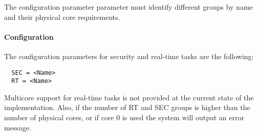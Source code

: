 The configuration parameter parameter must identify different groups by name
and their physical core requirements.




\paragraph{Configuration}
The configuration parameters for security and real-time tasks are the
following:
\begin{lstlisting}
  SEC = <Name>
  RT = <Name>
\end{lstlisting}
Multicore support for real-time tasks is not provided at the current state of
the implementation.
Also, if the number of RT and SEC groups is higher than the number of physical
cores, or if core 0 is used the system will output an error message.
